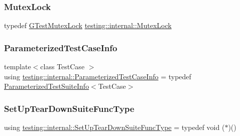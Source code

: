 \mbox{\label{namespacetesting_1_1internal_a08b187c6cc4e28400aadf9a32fccc8de}} 
\subsubsection{\texorpdfstring{Mutex\+Lock}{MutexLock}}
{\footnotesize\ttfamily typedef \hyperlink{classtesting_1_1internal_1_1GTestMutexLock}{G\+Test\+Mutex\+Lock} \hyperlink{namespacetesting_1_1internal_a08b187c6cc4e28400aadf9a32fccc8de}{testing\+::internal\+::\+Mutex\+Lock}}

\mbox{\label{namespacetesting_1_1internal_aac31682b6b41997d6cc610a5787dc8bc}} 
\subsubsection{\texorpdfstring{Parameterized\+Test\+Case\+Info}{ParameterizedTestCaseInfo}}
{\footnotesize\ttfamily template$<$class Test\+Case $>$ \\
using \hyperlink{namespacetesting_1_1internal_aac31682b6b41997d6cc610a5787dc8bc}{testing\+::internal\+::\+Parameterized\+Test\+Case\+Info} = typedef \hyperlink{classtesting_1_1internal_1_1ParameterizedTestSuiteInfo}{Parameterized\+Test\+Suite\+Info}$<$Test\+Case$>$}

\mbox{\label{namespacetesting_1_1internal_a04786aa10f8b0bf38a5ead94d00475f4}} 
\subsubsection{\texorpdfstring{Set\+Up\+Tear\+Down\+Suite\+Func\+Type}{SetUpTearDownSuiteFuncType}}
{\footnotesize\ttfamily using \hyperlink{namespacetesting_1_1internal_a04786aa10f8b0bf38a5ead94d00475f4}{testing\+::internal\+::\+Set\+Up\+Tear\+Down\+Suite\+Func\+Type} = typedef void ($\ast$)()}

